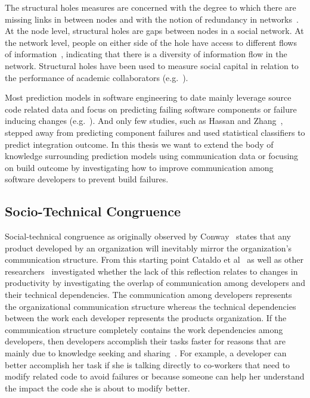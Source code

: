 The structural holes measures are concerned with the degree to which there
are missing links in between nodes and with the notion of redundancy in
networks~\cite{Burt:1995vo}. At the node level, structural holes are gaps between
nodes in a social network. At the network level, people on either side of the
hole have access to different flows of information~\cite{Hargadon:1997asq},
indicating that there is a diversity of information flow in the network.
Structural holes have been used to measure social capital in relation to the
performance of academic collaborators (e.g.~\cite{Brambila:PICMET2007}).

Most prediction models in software engineering to date mainly leverage source
code related data and focus on predicting failing software components or failure
inducing changes
(e.g.~\cite{bell:2005tse,schroeter:isese:2006,zimmermann:icse:2008,kim:2008tse}).
And only few studies, such as Hassan and Zhang~\cite{hassan:ase:2006}, stepped away
from predicting component failures and used statistical classifiers to predict
integration outcome.
In this thesis we want to extend the body of knowledge surrounding prediction models using communication data or focusing on build outcome by investigating how to improve communication among software developers to prevent build failures.







\subsection{Socio-Technical Congruence}
Social-technical congruence as originally observed by Conway~\cite{conway:datamination:1968} states that any product developed by an organization will inevitably mirror the organization's communication structure.
From this starting point Cataldo et al~\cite{cataldo:cscw:2006} as well as other researchers~\cite{valetto:msr:2007,ducheneaut:cscw:2005,ehrlich:stc:2008} investigated whether the lack of this reflection relates to changes in productivity by investigating the overlap of communication among developers and their technical dependencies.
The communication among developers represents the organizational communication structure whereas the technical dependencies between the work each developer represents the products organization.
If the communication structure completely contains the work dependencies among developers, then developers accomplish their tasks faster for reasons that are mainly due to knowledge seeking and sharing~\cite{desouza2006:knowledge}.
For example, a developer can better accomplish her task if she is talking directly to co-workers that need to modify related code to avoid failures or because someone can help her understand the impact the code she is about to modify better.

